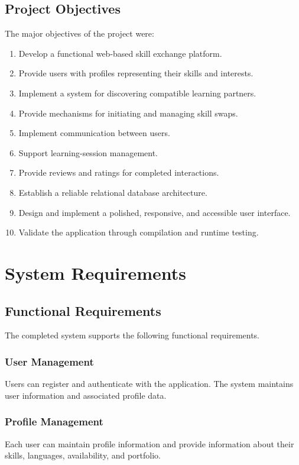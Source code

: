 \documentclass[12pt,a4paper]{report}
\begin{document}
\section{Project Objectives}
The major objectives of the project were:
\begin{enumerate}[noitemsep]
  \item Develop a functional web-based skill exchange platform.
  \item Provide users with profiles representing their skills and interests.
  \item Implement a system for discovering compatible learning partners.
  \item Provide mechanisms for initiating and managing skill swaps.
  \item Implement communication between users.
  \item Support learning-session management.
  \item Provide reviews and ratings for completed interactions.
  \item Establish a reliable relational database architecture.
  \item Design and implement a polished, responsive, and accessible user
        interface.
  \item Validate the application through compilation and runtime testing.
\end{enumerate}

\chapter{System Requirements}

\section{Functional Requirements}
The completed system supports the following functional requirements.

\subsection{User Management}
Users can register and authenticate with the application.  The system maintains
user information and associated profile data.

\subsection{Profile Management}
Each user can maintain profile information and provide information about their
skills, languages, availability, and portfolio.
\end{document}

